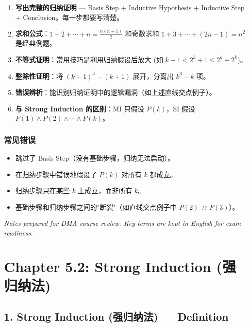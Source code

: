 \documentclass[10pt,a4paper,openany]{ctexbook}
\theoremstyle{definition}
\theoremstyle{remark}
\begin{document}
\begin{enumerate}
\item \textbf{写出完整的归纳证明} — Basis Step + Inductive Hypothesis + Inductive Step + Conclusion。每一步都要写清楚。
\item \textbf{求和公式}：$1+2+\cdots+n = \frac{n(n+1)}{2}$ 和奇数求和 $1+3+\cdots+(2n-1)=n^2$ 是经典例题。
\item \textbf{不等式证明}：常用技巧是利用归纳假设后放大 (如 $k+1 < 2^k + 1 \le 2^k + 2^k$)。
\item \textbf{整除性证明}：将 $(k+1)^3 - (k+1)$ 展开，分离出 $k^3 - k$ 项。
\item \textbf{错误辨析}：能识别归纳证明中的逻辑漏洞（如上述直线交点例子）。
\item \textbf{与 Strong Induction 的区别}：MI 只假设 $P(k)$，SI 假设 $P(1) \land P(2) \land \cdots \land P(k)$。

\end{enumerate}

\subsubsection{常见错误}

\begin{itemize}
\item 跳过了 Basis Step（没有基础步骤，归纳无法启动）。
\item 在归纳步骤中错误地假设了 $P(k)$ 对所有 $k$ 都成立。
\item 归纳步骤只在某些 $k$ 上成立，而非所有 $k$。
\item 基础步骤和归纳步骤之间的"断裂"（如直线交点例子中 $P(2) \not\to P(3)$）。

\end{itemize}

\vspace{-2pt}

\textit{Notes prepared for DMA course review. Key terms are kept in English for exam readiness.}

\newpage

\section{Chapter 5.2: Strong Induction (强归纳法)}

\vspace{-2pt}

\subsection{1. Strong Induction (强归纳法) — Definition}
\end{document}
